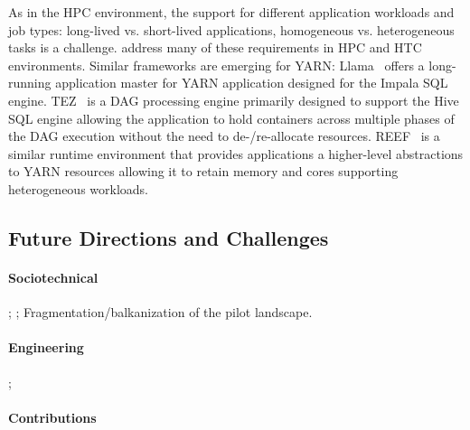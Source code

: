\documentclass{sig-alternate}
\begin{document}
As in the HPC environment, the support for different application
workloads and job types: long-lived vs. short-lived applications,
homogeneous vs. heterogeneous tasks is a challenge. \pilots address many
of these requirements in HPC and HTC environments. Similar frameworks
are emerging for YARN: Llama~\cite{llama} offers a long-running
application master for YARN application designed for the Impala SQL
engine. TEZ~\cite{tez} is a DAG processing engine primarily designed to
support the Hive SQL engine allowing the application to hold containers
across multiple phases of the DAG execution without the need to
de-/re-allocate resources. REEF~\cite{Chun:2013:RRE:2536274.2536318} is
a similar runtime environment that provides applications a higher-level
abstractions to YARN resources allowing it to retain memory and cores
supporting heterogeneous workloads.

\subsection{Future Directions and Challenges}
\label{sec:5.3}

\paragraph*{Sociotechnical} ;
; Fragmentation/balkanization of
the pilot landscape.

\paragraph*{Engineering} ; 

\paragraph*{Contributions} 
\end{document}
